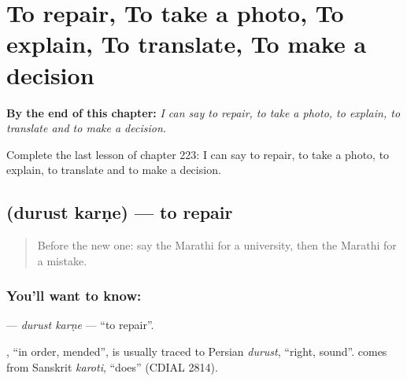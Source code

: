 
\chapter{To repair, To take a photo, To explain, To translate, To make a decision}
\label{ch:mr-to-repair-to-take-a-photo-to-explain-to-translate-to-make-a-decision}

\begin{chapteropening}
\textbf{By the end of this chapter:} \emph{I can say to repair, to take a photo, to explain, to translate and to make a decision.}

Complete the last lesson of chapter 223: I can say to repair, to take a photo, to explain, to translate and to make a decision.
\end{chapteropening}

\section[\texorpdfstring{\mr{दुरुस्त} \mr{करणे} (durust karṇe)}{दुरुस्त करणे (durust karṇe)}]{  (durust karṇe) — to repair}

\label{lesson:MR-C223-durust-karne}



\begin{quote}
Before the new one: say the Marathi for a university, then the Marathi for a mistake.
\end{quote}

\subsection*{You'll want to know:  }
\textbf{ } — \emph{durust karṇe} — \textquotedblleft{}to repair\textquotedblright{}.

\begin{cousinweb}
\textbf{}, \textquotedblleft{}in order, mended\textquotedblright{}, is usually traced to Persian \emph{durust}, \textquotedblleft{}right, sound\textquotedblright{}. \textbf{} comes from Sanskrit \emph{karoti}, \textquotedblleft{}does\textquotedblright{} (CDIAL 2814).
\end{cousinweb}

